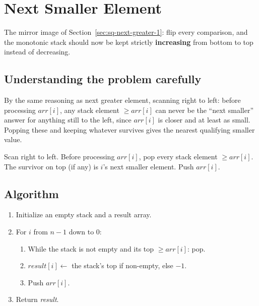 \section{Next Smaller Element}
\label{sec:sq-next-smaller}


\begin{patternbox}
The mirror image of Section~\ref{sec:sq-next-greater-1}: flip every
comparison, and the monotonic stack should now be kept strictly
\textbf{increasing} from bottom to top instead of decreasing.
\end{patternbox}

\subsection*{Understanding the problem carefully}

By the same reasoning as next greater element, scanning right to left:
before processing $\textit{arr}[i]$, any stack element $\ge
\textit{arr}[i]$ can never be the ``next smaller'' answer for anything
still to the left, since $\textit{arr}[i]$ is closer and at least as
small. Popping these and keeping whatever survives gives the nearest
qualifying smaller value.

\begin{ideabox}
Scan right to left. Before processing $\textit{arr}[i]$, pop every stack
element $\ge \textit{arr}[i]$. The survivor on top (if any) is $i$'s next
smaller element. Push $\textit{arr}[i]$.
\end{ideabox}

\subsection*{Algorithm}

\begin{enumerate}
  \item Initialize an empty stack and a result array.
  \item For $i$ from $n-1$ down to $0$:
  \begin{enumerate}
    \item While the stack is not empty and its top $\ge
          \textit{arr}[i]$: pop.
    \item $\textit{result}[i] \gets$ the stack's top if non-empty, else
          $-1$.
    \item Push $\textit{arr}[i]$.
  \end{enumerate}
  \item Return \textit{result}.
\end{enumerate}


